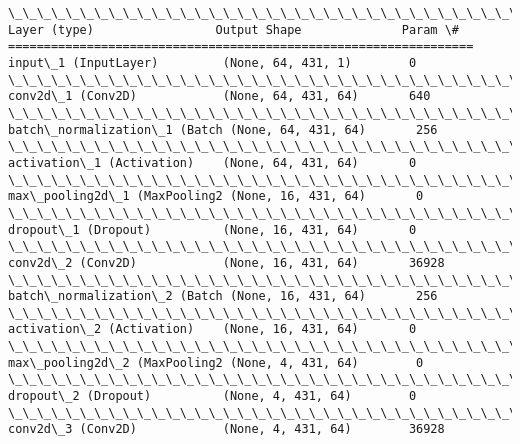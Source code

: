 \documentclass[11pt]{article}
\begin{document}
    \begin{Verbatim}[commandchars=\\\{\}]
\_\_\_\_\_\_\_\_\_\_\_\_\_\_\_\_\_\_\_\_\_\_\_\_\_\_\_\_\_\_\_\_\_\_\_\_\_\_\_\_\_\_\_\_\_\_\_\_\_\_\_\_\_\_\_\_\_\_\_\_\_\_\_\_\_
Layer (type)                 Output Shape              Param \#   
=================================================================
input\_1 (InputLayer)         (None, 64, 431, 1)        0         
\_\_\_\_\_\_\_\_\_\_\_\_\_\_\_\_\_\_\_\_\_\_\_\_\_\_\_\_\_\_\_\_\_\_\_\_\_\_\_\_\_\_\_\_\_\_\_\_\_\_\_\_\_\_\_\_\_\_\_\_\_\_\_\_\_
conv2d\_1 (Conv2D)            (None, 64, 431, 64)       640       
\_\_\_\_\_\_\_\_\_\_\_\_\_\_\_\_\_\_\_\_\_\_\_\_\_\_\_\_\_\_\_\_\_\_\_\_\_\_\_\_\_\_\_\_\_\_\_\_\_\_\_\_\_\_\_\_\_\_\_\_\_\_\_\_\_
batch\_normalization\_1 (Batch (None, 64, 431, 64)       256       
\_\_\_\_\_\_\_\_\_\_\_\_\_\_\_\_\_\_\_\_\_\_\_\_\_\_\_\_\_\_\_\_\_\_\_\_\_\_\_\_\_\_\_\_\_\_\_\_\_\_\_\_\_\_\_\_\_\_\_\_\_\_\_\_\_
activation\_1 (Activation)    (None, 64, 431, 64)       0         
\_\_\_\_\_\_\_\_\_\_\_\_\_\_\_\_\_\_\_\_\_\_\_\_\_\_\_\_\_\_\_\_\_\_\_\_\_\_\_\_\_\_\_\_\_\_\_\_\_\_\_\_\_\_\_\_\_\_\_\_\_\_\_\_\_
max\_pooling2d\_1 (MaxPooling2 (None, 16, 431, 64)       0         
\_\_\_\_\_\_\_\_\_\_\_\_\_\_\_\_\_\_\_\_\_\_\_\_\_\_\_\_\_\_\_\_\_\_\_\_\_\_\_\_\_\_\_\_\_\_\_\_\_\_\_\_\_\_\_\_\_\_\_\_\_\_\_\_\_
dropout\_1 (Dropout)          (None, 16, 431, 64)       0         
\_\_\_\_\_\_\_\_\_\_\_\_\_\_\_\_\_\_\_\_\_\_\_\_\_\_\_\_\_\_\_\_\_\_\_\_\_\_\_\_\_\_\_\_\_\_\_\_\_\_\_\_\_\_\_\_\_\_\_\_\_\_\_\_\_
conv2d\_2 (Conv2D)            (None, 16, 431, 64)       36928     
\_\_\_\_\_\_\_\_\_\_\_\_\_\_\_\_\_\_\_\_\_\_\_\_\_\_\_\_\_\_\_\_\_\_\_\_\_\_\_\_\_\_\_\_\_\_\_\_\_\_\_\_\_\_\_\_\_\_\_\_\_\_\_\_\_
batch\_normalization\_2 (Batch (None, 16, 431, 64)       256       
\_\_\_\_\_\_\_\_\_\_\_\_\_\_\_\_\_\_\_\_\_\_\_\_\_\_\_\_\_\_\_\_\_\_\_\_\_\_\_\_\_\_\_\_\_\_\_\_\_\_\_\_\_\_\_\_\_\_\_\_\_\_\_\_\_
activation\_2 (Activation)    (None, 16, 431, 64)       0         
\_\_\_\_\_\_\_\_\_\_\_\_\_\_\_\_\_\_\_\_\_\_\_\_\_\_\_\_\_\_\_\_\_\_\_\_\_\_\_\_\_\_\_\_\_\_\_\_\_\_\_\_\_\_\_\_\_\_\_\_\_\_\_\_\_
max\_pooling2d\_2 (MaxPooling2 (None, 4, 431, 64)        0         
\_\_\_\_\_\_\_\_\_\_\_\_\_\_\_\_\_\_\_\_\_\_\_\_\_\_\_\_\_\_\_\_\_\_\_\_\_\_\_\_\_\_\_\_\_\_\_\_\_\_\_\_\_\_\_\_\_\_\_\_\_\_\_\_\_
dropout\_2 (Dropout)          (None, 4, 431, 64)        0         
\_\_\_\_\_\_\_\_\_\_\_\_\_\_\_\_\_\_\_\_\_\_\_\_\_\_\_\_\_\_\_\_\_\_\_\_\_\_\_\_\_\_\_\_\_\_\_\_\_\_\_\_\_\_\_\_\_\_\_\_\_\_\_\_\_
conv2d\_3 (Conv2D)            (None, 4, 431, 64)        36928     

\end{Verbatim}
\end{document}
